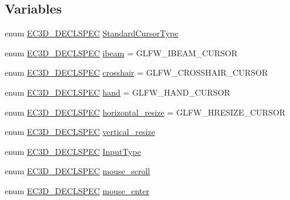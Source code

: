 \subsection*{Variables}
\begin{DoxyCompactItemize}
\item 
enum \mbox{\hyperlink{_common_8h_aac42573e202ca3dd4d259c81691e2369}{E\+C3\+D\+\_\+\+D\+E\+C\+L\+S\+P\+EC}} \mbox{\hyperlink{namespaceec_ab32dc7f72e1021f7625fca2b4693d297}{Standard\+Cursor\+Type}}
\item 
enum \mbox{\hyperlink{_common_8h_aac42573e202ca3dd4d259c81691e2369}{E\+C3\+D\+\_\+\+D\+E\+C\+L\+S\+P\+EC}} \mbox{\hyperlink{namespaceec_a11b97e3d63932d34e6fb306f5389cad0}{ibeam}} = G\+L\+F\+W\+\_\+\+I\+B\+E\+A\+M\+\_\+\+C\+U\+R\+S\+OR
\item 
enum \mbox{\hyperlink{_common_8h_aac42573e202ca3dd4d259c81691e2369}{E\+C3\+D\+\_\+\+D\+E\+C\+L\+S\+P\+EC}} \mbox{\hyperlink{namespaceec_a7d6502eddc910822e32f6ba96543bb05}{crosshair}} = G\+L\+F\+W\+\_\+\+C\+R\+O\+S\+S\+H\+A\+I\+R\+\_\+\+C\+U\+R\+S\+OR
\item 
enum \mbox{\hyperlink{_common_8h_aac42573e202ca3dd4d259c81691e2369}{E\+C3\+D\+\_\+\+D\+E\+C\+L\+S\+P\+EC}} \mbox{\hyperlink{namespaceec_ac46e526319ef43480ea56e96f7042e10}{hand}} = G\+L\+F\+W\+\_\+\+H\+A\+N\+D\+\_\+\+C\+U\+R\+S\+OR
\item 
enum \mbox{\hyperlink{_common_8h_aac42573e202ca3dd4d259c81691e2369}{E\+C3\+D\+\_\+\+D\+E\+C\+L\+S\+P\+EC}} \mbox{\hyperlink{namespaceec_a6331d0d47cac81ec8a5104b9c2f647fe}{horizontal\+\_\+resize}} = G\+L\+F\+W\+\_\+\+H\+R\+E\+S\+I\+Z\+E\+\_\+\+C\+U\+R\+S\+OR
\item 
enum \mbox{\hyperlink{_common_8h_aac42573e202ca3dd4d259c81691e2369}{E\+C3\+D\+\_\+\+D\+E\+C\+L\+S\+P\+EC}} \mbox{\hyperlink{namespaceec_a0608ba5ea3b0115a1133083305516b1e}{vertical\+\_\+resize}}
\item 
enum \mbox{\hyperlink{_common_8h_aac42573e202ca3dd4d259c81691e2369}{E\+C3\+D\+\_\+\+D\+E\+C\+L\+S\+P\+EC}} \mbox{\hyperlink{namespaceec_ae2d697393ea83b34b18ab14eb5dacbca}{Input\+Type}}
\item 
enum \mbox{\hyperlink{_common_8h_aac42573e202ca3dd4d259c81691e2369}{E\+C3\+D\+\_\+\+D\+E\+C\+L\+S\+P\+EC}} \mbox{\hyperlink{namespaceec_a7fb336f49377247955ebd3f6658ba50b}{mouse\+\_\+scroll}}
\item 
enum \mbox{\hyperlink{_common_8h_aac42573e202ca3dd4d259c81691e2369}{E\+C3\+D\+\_\+\+D\+E\+C\+L\+S\+P\+EC}} \mbox{\hyperlink{namespaceec_a7b76ba0c0ae46329abe1fc22115ab729}{mouse\+\_\+enter}}

\end{DoxyCompactItemize}

